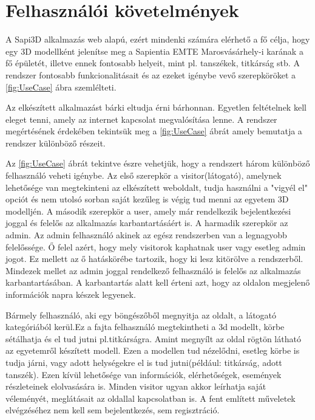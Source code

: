 \section{Felhasználói követelmények}

A Sapi3D alkalmazás web alapú, ezért mindenki számára elérhető
a fő célja, hogy egy 3D modellként jelenítse meg a Sapientia EMTE Marosvásárhely-i karának a fő épületét, illetve ennek fontosabb helyeit, mint pl. tanszékek, titkárság stb. A rendszer fontosabb funkcionalitásait és az ezeket igénybe vevő szerepköröket a \ref{fig:UseCase} ábra szemlélteti.

Az elkészített alkalmazást bárki eltudja érni bárhonnan. Egyetlen feltételnek kell eleget tenni, amely az internet kapcsolat megvalósítása lenne. A rendszer megértésének érdekében tekintsük meg a \ref{fig:UseCase} ábrát amely bemutatja a rendszer különböző részeit.

Az \ref{fig:UseCase} ábrát tekintve észre vehetjük, hogy a rendszert három különböző felhasználó veheti igénybe. Az első szerepkör a visitor(látogató), amelynek lehetősége van megtekinteni az elkészített weboldalt, tudja használni a "vigyél el" opciót és nem utolsó sorban saját kezűleg is végig tud menni az egyetem 3D modelljén. A második szerepkör a user, amely már rendelkezik bejelentkezési joggal és felelős az alkalmazás karbantartásáért is. A harmadik szerepkör az admin. Az admin felhasználó akinek az egész rendszerben van a legnagyobb felelőssége. Ő felel azért, hogy mely visitorok kaphatnak user vagy esetleg admin jogot. Ez mellett az ő hatáskörébe tartozik, hogy ki lesz kitörölve a rendszerből. Mindezek mellet az admin joggal rendelkező felhasználó is felelős az alkalmazás karbantartásában. A karbantartás alatt kell érteni azt, hogy az oldalon megjelenő információk napra készek legyenek.

Bármely felhasználó, aki egy böngészőből megnyitja az oldalt, a látogató kategóriából kerül.Ez a fajta felhasználó megtekintheti a 3d modellt, körbe sétálhatja és el tud jutni pl.titkárságra. Amint megnyílt az oldal rögtön látható az egyetemről készített modell. Ezen a modellen tud nézelődni, esetleg körbe is tudja járni, vagy adott helységekre el is tud jutni(például: titkárság, adott tanszék). Ezen kívül lehetősége van információk, elérhetőségek, események részleteinek elolvasására is. Minden visitor ugyan akkor leírhatja saját véleményét, meglátásait az oldallal kapcsolatban is. A fent említett műveletek elvégzéséhez nem kell sem bejelentkezés, sem regisztráció.

